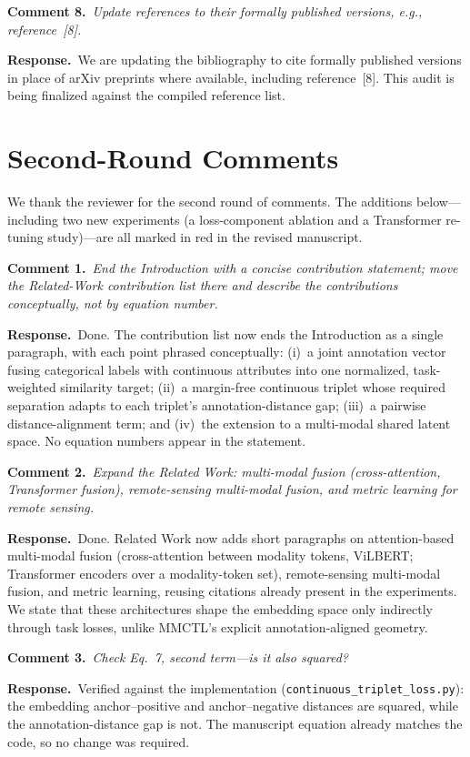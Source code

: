 \documentclass[10pt,twocolumn,letterpaper]{article}
\newcommand{\cmt}[2]{\smallskip\noindent\textbf{Comment #1.}\ \textit{#2}\par}
\newcommand{\resp}[1]{\noindent\textbf{Response.}\ #1\par}
\begin{document}
\cmt{8}{Update references to their formally published versions, e.g.,
reference~[8].}
\resp{We are updating the bibliography to cite formally published versions in
place of arXiv preprints where available, including reference~[8]. This audit is
being finalized against the compiled reference list.}

{\color{red}
\section{Second-Round Comments}

\noindent We thank the reviewer for the second round of comments. The additions
below---including two new experiments (a loss-component ablation and a Transformer
re-tuning study)---are all marked in red in the revised manuscript.

\cmt{1}{End the Introduction with a concise contribution statement; move the
Related-Work contribution list there and describe the contributions conceptually,
not by equation number.}
\resp{Done. The contribution list now ends the Introduction as a single
paragraph, with each point phrased conceptually: (i)~a joint annotation vector
fusing categorical labels with continuous attributes into one normalized,
task-weighted similarity target; (ii)~a margin-free continuous triplet whose
required separation adapts to each triplet's annotation-distance gap;
(iii)~a pairwise distance-alignment term; and (iv)~the extension to a multi-modal
shared latent space. No equation numbers appear in the statement.}

\cmt{2}{Expand the Related Work: multi-modal fusion (cross-attention, Transformer
fusion), remote-sensing multi-modal fusion, and metric learning for remote
sensing.}
\resp{Done. Related Work now adds short paragraphs on attention-based multi-modal
fusion (cross-attention between modality tokens, ViLBERT; Transformer encoders
over a modality-token set), remote-sensing multi-modal fusion, and metric
learning, reusing citations already present in the experiments. We state that
these architectures shape the embedding space only indirectly through task
losses, unlike MMCTL's explicit annotation-aligned geometry.}

\cmt{3}{Check Eq.~7, second term---is it also squared?}
\resp{Verified against the implementation (\texttt{continuous\_triplet\_loss.py}):
the embedding anchor--positive and anchor--negative distances are squared, while
the annotation-distance gap is not. The manuscript equation already matches the
code, so no change was required.}

}
\end{document}
